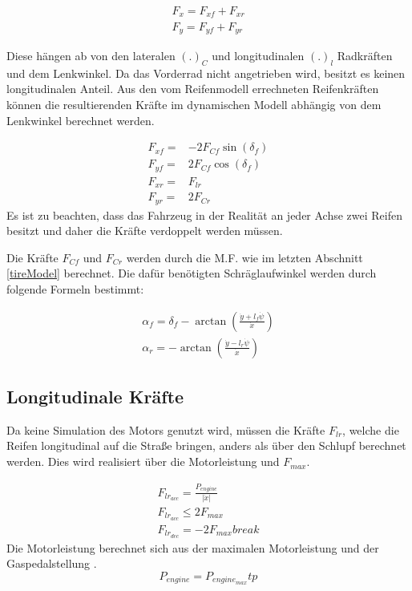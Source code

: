 \documentclass{like}
\begin{document}
\begin{eqnarray}
F_x = F_{xf} + F_{xr} \\
F_y = F_{yf} + F_{yr}
\end{eqnarray}

Diese hängen ab von den lateralen \((.)_C\) und longitudinalen \((.)_l\)    Radkräften und dem Lenkwinkel. Da das Vorderrad nicht angetrieben wird, besitzt es keinen longitudinalen Anteil. Aus den vom Reifenmodell errechneten Reifenkräften können die resultierenden Kräfte im dynamischen Modell abhängig von dem Lenkwinkel berechnet werden.

\begin{eqnarray}
F_{xf} =& - 2 F_{Cf} \sin(\delta_f) \\
F_{yf} =& 2 F_{Cf} \cos(\delta_f) \\
F_{xr} =&   F_{lr} \\
F_{yr} =& 2 F_{Cr}
\end{eqnarray}
Es ist zu beachten, dass das Fahrzeug in der Realität an jeder Achse zwei Reifen besitzt und daher die Kräfte verdoppelt werden müssen.


Die Kräfte \(F_{Cf}\) und \(F_{Cr}\) werden durch die \ac{M.F.} wie im letzten Abschnitt \ref{tireModel} berechnet.
Die dafür benötigten Schräglaufwinkel werden durch folgende Formeln bestimmt:

\begin{eqnarray}
\alpha_f = \delta_f - \arctan \left(\frac{\dot{y} + l_f \dot{\psi}}{\dot{x}} \right) \\
\alpha_r = - \arctan \left(\frac{\dot{y} - l_r \dot{\psi}}{\dot{x}} \right)
\end{eqnarray}

\subsection*{Longitudinale Kräfte}
Da keine Simulation des Motors genutzt wird, müssen die Kräfte \(F_{lr}\), welche die Reifen longitudinal auf die Straße bringen, anders als über den Schlupf berechnet werden.
Dies wird realisiert über die Motorleistung und \(F_{max}\).

\begin{eqnarray}
F_{lr_{acc}} = \frac{P_{engine}}{|\dot{x}|} \label{long_dyn_engine}\\
F_{lr_{acc}}\leq 2 F_{max} \label{long_dyn_max}\\
F_{lr_{dec}} = - 2 F_{max}  break
\end{eqnarray}
Die Motorleistung berechnet sich aus der maximalen Motorleistung und der Gaspedalstellung .
\begin{equation}
	P_{engine} = P_{engine_{max}} tp
\end{equation}
\end{document}
